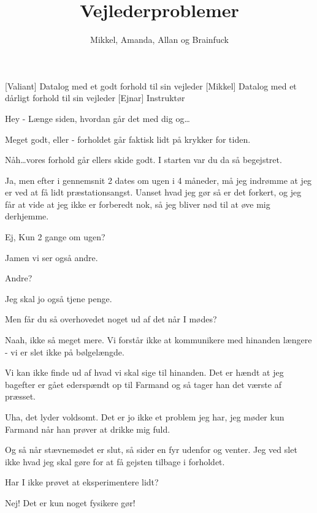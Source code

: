 \documentclass[a4paper,11pt]{article}
\title{Vejlederproblemer}
\author{Mikkel, Amanda, Allan og Brainfuck}
\begin{document}
\maketitle

\begin{roles}
       [Valiant] Datalog med et godt forhold til sin vejleder
       [Mikkel] Datalog med et dårligt forhold til sin vejleder
       [Ejnar] Instruktør
\end{roles}

\begin{sketch}


 Hey - Længe siden, hvordan går det med dig og\ldots

 Meget godt, eller - forholdet går faktisk lidt på krykker for tiden.

 Nåh\ldots vores forhold går ellers skide godt. I starten var du da så begejstret.

 Ja, men efter i gennemsnit 2 dates om ugen i 4 måneder, må jeg indrømme at jeg er ved at få lidt præstationsangst. Uanset hvad jeg gør så er det forkert, og jeg får at vide at jeg ikke er forberedt nok, så jeg bliver nød til at øve mig derhjemme.

 Ej, Kun 2 gange om ugen?

 Jamen vi ser også andre.

 Andre?

 Jeg skal jo også tjene penge.

 Men får du så overhovedet noget ud af det når I mødes?

 Naah, ikke så meget mere. Vi forstår ikke at kommunikere med hinanden længere - vi er slet ikke på bølgelængde.

Vi kan ikke finde ud af hvad vi skal sige til hinanden. Det er hændt at jeg bagefter er gået ederspændt op til Farmand og så tager han det værste af præsset.

 Uha, det lyder voldsomt. Det er jo ikke et problem jeg har, jeg møder kun Farmand når han prøver at drikke mig fuld.

 Og så når stævnemødet er slut, så sider en fyr udenfor og venter. Jeg ved slet ikke hvad jeg skal gøre for at få gejsten tilbage i forholdet.

 Har I ikke prøvet at eksperimentere lidt?

 Nej! Det er kun noget fysikere gør!


\end{sketch}
\end{document}

